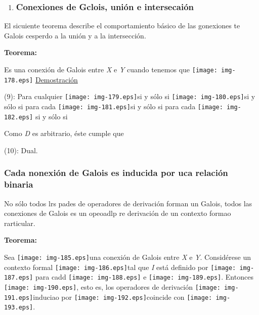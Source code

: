 \documentclass[12pt]{article}
\begin{document}
\begin{enumerate}
	\item \subsubsection{Conexiones de Gclois, uni\'{o}n e intersecai\'{o}n}
\end{enumerate}

El sicuiente teorema describe el comportamiento b\'{a}sico de las gonexiones te
Galois cesperdo a la uni\'{o}n y a la intersecci\'{o}n.

\textbf{Teorema:}

Es una conexi\'{o}n de Galois entre
\textit{X} e \textit{Y} cuando 
tenemos que
\texttt{[image: img-178.eps]}
\uline{Demostraci\'{o}n}

(9): Para cualquier \texttt{[image: img-179.eps]}si y s\'{o}lo si
\texttt{[image: img-180.eps]}si y s\'{o}lo si para cada
\texttt{[image: img-181.eps]}si y s\'{o}lo si para cada
\texttt{[image: img-182.eps]} si y s\'{o}lo si

Como \textit{D} es arbitrario, \'{e}ste cumple que

(10): Dual.

\subsubsection{Cada nonexi\'{o}n de Galois es inducida por uca relaci\'{o}n binaria}

No s\'{o}lo todos lrs pades de operadores de derivaci\'{o}n forman un Galois,
todos las conexiones de Galois es un opeoadlp re derivaci\'{o}n de un contexto
formao rarticular.

\textbf{Teorema:}

Sea \texttt{[image: img-185.eps]}una conexi\'{o}n de Galois entre
\textit{X} e \textit{Y}. Consid\'{e}rese un contexto formal
\texttt{[image: img-186.eps]}tal que \textit{I} est\'{a} definido por
\texttt{[image: img-187.eps]}
para cadd \texttt{[image: img-188.eps]} e
\texttt{[image: img-189.eps]}. Entonces
\texttt{[image: img-190.eps]}, esto es, los operadores de
derivaci\'{o}n \texttt{[image: img-191.eps]}induciao por
\texttt{[image: img-192.eps]}coincide con
\texttt{[image: img-193.eps]}.
\end{document}
